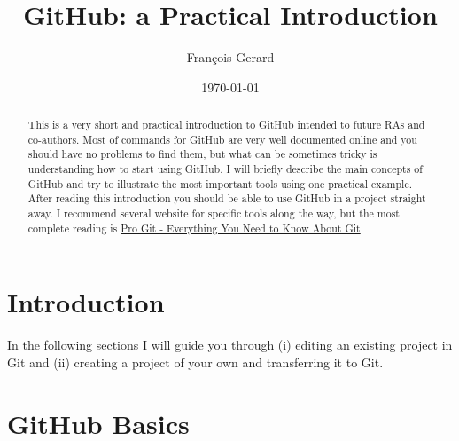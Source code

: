 \documentclass[12pt]{article}
\begin{document}
\title{GitHub: a Practical Introduction} %
\author{Fran\c{c}ois Gerard} %


\date{\today}  %

\maketitle  %



\begin{abstract} 
	This is a very short and practical introduction to GitHub intended to future RAs and co-authors. Most of commands for GitHub are very well documented online and you should have no problems to find them, but what can be sometimes tricky is understanding how to start using GitHub. I will briefly describe the main concepts of GitHub and try to illustrate the most important tools using one practical example. After reading this introduction you should be able to use GitHub in a project straight away. I recommend several website for specific tools along the way, but the most complete reading is \href{https://git-scm.com/book/en/v2}{Pro Git - Everything You Need to Know About Git} %
\end{abstract}

\section{Introduction}
	 
    In the following sections I will guide you through (i) editing an existing project in Git and (ii) creating a project of your own and transferring it to Git.
    
    
\section{GitHub Basics}
\end{document}
